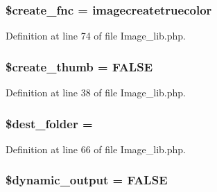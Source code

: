 \subsubsection[{\texorpdfstring{\$create\+\_\+fnc}{$create_fnc}}]{\setlength{\rightskip}{0pt plus 5cm}\$create\+\_\+fnc = \textquotesingle{}imagecreatetruecolor\textquotesingle{}}\hypertarget{class_c_i___image__lib_af70f0124d1a34ec7b7360bee16c3a3ea}{}\label{class_c_i___image__lib_af70f0124d1a34ec7b7360bee16c3a3ea}


Definition at line 74 of file Image\+\_\+lib.\+php.

\subsubsection[{\texorpdfstring{\$create\+\_\+thumb}{$create_thumb}}]{\setlength{\rightskip}{0pt plus 5cm}\$create\+\_\+thumb = F\+A\+L\+SE}\hypertarget{class_c_i___image__lib_ab1250903cbadaaadb42ec188d38ab398}{}\label{class_c_i___image__lib_ab1250903cbadaaadb42ec188d38ab398}


Definition at line 38 of file Image\+\_\+lib.\+php.

\subsubsection[{\texorpdfstring{\$dest\+\_\+folder}{$dest_folder}}]{\setlength{\rightskip}{0pt plus 5cm}\$dest\+\_\+folder = \textquotesingle{}\textquotesingle{}}\hypertarget{class_c_i___image__lib_a23c580d10b1ba89c5b532f43fe2c6f59}{}\label{class_c_i___image__lib_a23c580d10b1ba89c5b532f43fe2c6f59}


Definition at line 66 of file Image\+\_\+lib.\+php.

\subsubsection[{\texorpdfstring{\$dynamic\+\_\+output}{$dynamic_output}}]{\setlength{\rightskip}{0pt plus 5cm}\$dynamic\+\_\+output = F\+A\+L\+SE}\hypertarget{class_c_i___image__lib_ad90737913d82776e7d3a7dfaef68e167}{}\label{class_c_i___image__lib_ad90737913d82776e7d3a7dfaef68e167}


